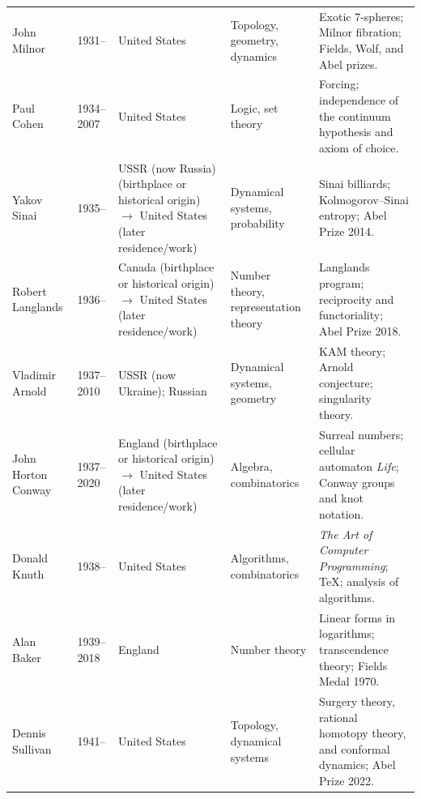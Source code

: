 {\begin{longtable}{@{}L{0.145\textwidth}L{0.09\textwidth}L{0.225\textwidth}L{0.14\textwidth}L{0.30\textwidth}@{}}
        John Milnor
        & 1931--
        & United States
        & Topology, geometry, dynamics
        & Exotic $7$-spheres; Milnor fibration; Fields, Wolf, and Abel prizes. \\

        Paul Cohen
        & 1934--2007
        & United States
        & Logic, set theory
        & Forcing; independence of the continuum hypothesis and axiom of
          choice. \\

        Yakov Sinai
        & 1935--
        & USSR (now Russia) (birthplace or historical origin) \(\to\) United States (later residence/work)
        & Dynamical systems, probability
        & Sinai billiards; Kolmogorov--Sinai entropy; Abel Prize 2014. \\

        Robert Langlands
        & 1936--
        & Canada (birthplace or historical origin) \(\to\) United States (later residence/work)
        & Number theory, representation theory
        & Langlands program; reciprocity and functoriality; Abel Prize 2018. \\

        Vladimir Arnold
        & 1937--2010
        & USSR (now Ukraine); Russian
        & Dynamical systems, geometry
        & KAM theory; Arnold conjecture; singularity theory. \\

        John Horton Conway
        & 1937--2020
        & England (birthplace or historical origin) \(\to\) United States (later residence/work)
        & Algebra, combinatorics
        & Surreal numbers; cellular automaton \textit{Life}; Conway groups and
          knot notation. \\

        Donald Knuth
        & 1938--
        & United States
        & Algorithms, combinatorics
        & \textit{The Art of Computer Programming}; TeX; analysis of
          algorithms. \\

        Alan Baker
        & 1939--2018
        & England
        & Number theory
        & Linear forms in logarithms; transcendence theory; Fields Medal 1970. \\

        Dennis Sullivan
        & 1941--
        & United States
        & Topology, dynamical systems
        & Surgery theory, rational homotopy theory, and conformal dynamics;
          Abel Prize 2022. \\


\end{longtable}}
